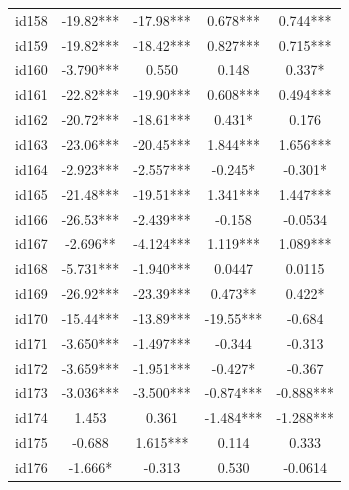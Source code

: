 \documentclass[num-refs]{wiley-article}
\begin{document}
\begin{center}
\begin{longtable}{ccccc}
id158                    & -19.82*** & -17.98***      & 0.678***          & 0.744***          \\
id159                    & -19.82*** & -18.42***      & 0.827***          & 0.715***          \\
id160                    & -3.790*** & 0.550          & 0.148             & 0.337*            \\
id161                    & -22.82*** & -19.90***      & 0.608***          & 0.494***          \\
id162                    & -20.72*** & -18.61***      & 0.431*            & 0.176             \\
id163                    & -23.06*** & -20.45***      & 1.844***          & 1.656***          \\
id164                    & -2.923*** & -2.557***      & -0.245*           & -0.301*           \\
id165                    & -21.48*** & -19.51***      & 1.341***          & 1.447***          \\
id166                    & -26.53*** & -2.439***      & -0.158            & -0.0534           \\
id167                    & -2.696**  & -4.124***      & 1.119***          & 1.089***          \\
id168                    & -5.731*** & -1.940***      & 0.0447            & 0.0115            \\
id169                    & -26.92*** & -23.39***      & 0.473**           & 0.422*            \\
id170                    & -15.44*** & -13.89***      & -19.55***         & -0.684            \\
id171                    & -3.650*** & -1.497***      & -0.344            & -0.313            \\
id172                    & -3.659*** & -1.951***      & -0.427*           & -0.367            \\
id173                    & -3.036*** & -3.500***      & -0.874***         & -0.888***         \\
id174                    & 1.453     & 0.361          & -1.484***         & -1.288***         \\
id175                    & -0.688    & 1.615***       & 0.114             & 0.333             \\
id176                    & -1.666*   & -0.313         & 0.530             & -0.0614           \\

\end{longtable}
\end{center}
\end{document}
